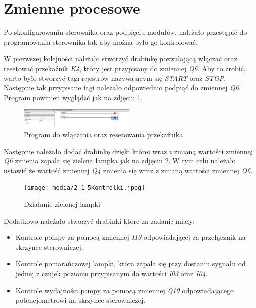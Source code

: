 \documentclass{article}
\begin{document}
\newpage
\section{Zmienne procesowe}
Po skonfigurowaniu sterownika oraz podpięciu modułów, należało przestąpić do programowania sterownika tak aby można było go kontrolować. 

W pierwszej kolejności należało stworzyć drabinkę pozwalającą włączać oraz resetować przekaźnik \textit{K4}, który jest przypisany do zmiennej \textit{Q6}. Aby to zrobić, warto było stworzyć tagi rejestrów nazywającym się \textit{START} oraz \textit{STOP}. Następnie tak przypisane tagi należało odpowiednio podpiąć do zmiennej \textit{Q6}. Program powinien wyglądać jak na zdjęciu \ref{fig:zdj9}.

\begin{figure}[H]
    \centering
    \includegraphics[width=0.5\textwidth]{media/2_1_Podstawowe_bramki_do_guzików.png}
    \caption{Program do włączania oraz resetowania przekaźnika}
    \label{fig:zdj9}
\end{figure}

Następnie należało dodać drabinkę dzięki której wraz z zmianą wartości zmiennej \textit{Q6} zmienia zapala się zielona lampka jak na zdjęciu \ref{fig:zdj10}. W tym celu należało ustawić że wartość zmiennej \textit{Q4} zmienia się wraz z zmianą wartości zmiennej \textit{Q6}. 

\begin{figure}[H]
    \centering
    \texttt{[image: media/2\_1\_5Kontrolki.jpeg]}
    \caption{Działanie zielonej lampki}
    \label{fig:zdj10}
\end{figure}

Dodatkowo należało stworzyć drabinki które za zadanie miały:
\begin{itemize}
    \item Kontrole pompy za pomocą zmiennej \textit{I13} odpowiadającej za przełącznik na skrzynce sterowniczej.
    \item Kontrole pomarańczowej lampki, która zapala się przy dostaniu sygnału od jednej z czujek poziomu przypisanym do wartości \textit{I03} oraz \textit{I04}.
    \item Kontrole wydajności pompy za pomocą zmiennej \textit{Q10} odpowiadającego potencjometrowi na skrzynce sterowniczej.
\end{itemize}
\end{document}
